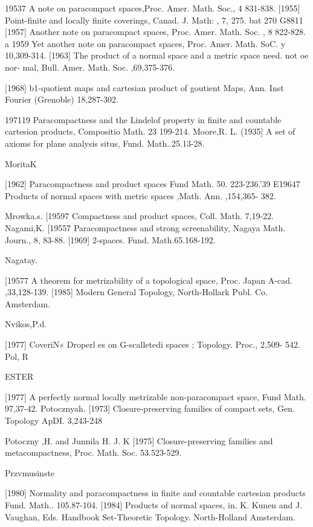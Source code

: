 \documentclass[main.tex]{subfiles}
\begin{document}
{19537
	A note on paracompact spaces,Proc. Amer. Math. Soc., 4 831-838.
	[1955]
	Point-finite and locally finite coverings, Canad. J. Math: , 7, 275.
	bat 270
	G8811
	[1957]
	Another note on paracompact spaces, Proc. Amer. Math. Soc. , 8
	822-828.
	a 1959 Yet another note on paracompact spaces, Proc. Amer. Math.
	SoC. y
	10,309-314.
	[1963]
	The product of a normal space and a metric space
	need. not oe nor-
	mal, Bull. Amer. Math. Soc. ,69,375-376.

	[1968]
	b1-quotient maps and cartesian product of goutient Maps, Ann. Inst
	Fourier (Grenoble) 18,287-302.

	197119 Paracompactness and the Lindelof property in finite and countable
	cartesion products, Compositio Math. 23 199-214.
	Moore,R. L.
	(1935]
	A set of axioms for plane analysis situs, Fund. Math..25.13-28.
	
	MoritaK

	[1962]
	Paracompactness and product spaces Fund Math. 50. 223-236.'39
	E19647 Products of normal spaces with metric spaces ,Math. Ann. ,154,365-
	382.

	Mrowka.s.
	[19597 Compactness and product spaces, Coll. Math. 7,19-22.
	Nagami,K.
	[19557 Paracompactness and strong screenability, Nagaya Math. Journ., 8,
	83-88.
	[1969]
	2-spaces. Fund. Math.65.168-192.

	Nagatay.

	[19577 A theorem for metrizability of a topological space, Proc. Japan A-cad. ,33,128-139.
	[1985]
	Modern General Topology, North-Hollark Publ. Co.
	~ Amsterdam.

	Nvikos,P.d.

	[1977]
	CoveriN« Droperl
	es on G-scalletedi spaces ; Topology. Proc., 2,509-
	542.
	Pol, R

	ESTER

	[1977] A perfectly normal locally metrizable non-paracompact space, Fund
	Math.
	97,37-42.
	Potocznyah.
	[1973]
	Closure-preserving families of compact sets, Gen. Topology ApDI.
	3,243-248

	Potoczny ,H. and Junnila H. J. K
	[1975]%
	Closure-preserving
	families and metacompactness, Proc.
	Math. Soc.
	53.523-529.

	Przvmusinste

	[1980]
	Normality and paracompactness in finite and countable cartesian
	products Fund. Math.. 105.87-104.
	[1984]
	Products of normal spaces, in. K. Kunen and J. Vaughan, Eds.
	Handbook
	Set-Theoretic
	Topology.
	North-Holland
	Amsterdam.

}
\end{document}
